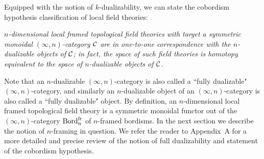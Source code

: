 \documentclass{amsart}
\begin{document}


Equipped with the notion of $k$-dualizability, we can state the cobordism hypothesis classification of local field theories: \vspace{7pt}

\setlength{\leftskip}{.75cm}

 \emph{$n$-dimensional local framed topological field theories with target a symmetric monoidal $(\infty,n)$-category $\mathcal C$ are in one-to-one correspondence with the $n$-dualizable objects of $\mathcal C$; in fact, the space of such field theories is homotopy equivalent to the space of $n$-dualizable objects of $\mathcal C$.} \vspace{7pt}

\setlength{\leftskip}{0cm}

\nid Note that an $n$-dualizable $(\infty,n)$-category is also called a ``fully dualizable" $(\infty,n)$-category, and similarly an $n$-dualizable object of an $(\infty,n)$-category is also called a ``fully dualizable" object.  By definition, an $n$-dimensional local framed topological field theory is a symmetric monoidal functor out of the $(\infty,n)$-category $\mathrm{Bord}^\mathrm{fr}_n$ of $n$-framed bordisms.  In the next section we describe the notion of $n$-framing in question.  We refer the reader to Appendix~A for a more detailed and precise review of the notion of full dualizability and statement of the cobordism hypothesis.  
\end{document}
